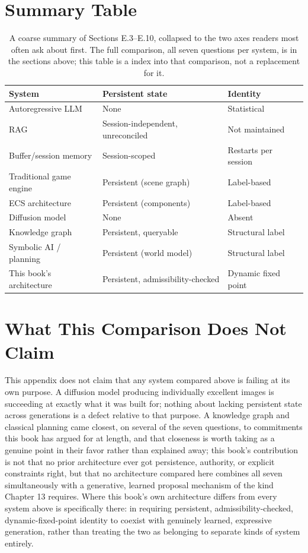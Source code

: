 \section{Summary Table}

\begin{table}[p]
\small
\begin{tabular}{@{}p{3.1cm}p{2.0cm}p{2.1cm}@{}}
\toprule
System & Persistent state & Identity \\
\midrule
Autoregressive LLM & None & Statistical \\
RAG & Session-independent, unreconciled & Not maintained \\
Buffer/session memory & Session-scoped & Restarts per session \\
Traditional game engine & Persistent (scene graph) & Label-based \\
ECS architecture & Persistent (components) & Label-based \\
Diffusion model & None & Absent \\
Knowledge graph & Persistent, queryable & Structural label \\
Symbolic AI / planning & Persistent (world model) & Structural label \\
This book's architecture & Persistent, admissibility-checked & Dynamic fixed point \\
\bottomrule
\end{tabular}
\caption{A coarse summary of Sections E.3--E.10, collapsed to the two axes readers most often ask about first. The full comparison, all seven questions per system, is in the sections above; this table is a index into that comparison, not a replacement for it.}
\end{table}

\section{What This Comparison Does Not Claim}

This appendix does not claim that any system compared above is failing at its own purpose. A diffusion model producing individually excellent images is succeeding at exactly what it was built for; nothing about lacking persistent state across generations is a defect relative to that purpose. A knowledge graph and classical planning came closest, on several of the seven questions, to commitments this book has argued for at length, and that closeness is worth taking as a genuine point in their favor rather than explained away; this book's contribution is not that no prior architecture ever got persistence, authority, or explicit constraints right, but that no architecture compared here combines all seven simultaneously with a generative, learned proposal mechanism of the kind Chapter 13 requires. Where this book's own architecture differs from every system above is specifically there: in requiring persistent, admissibility-checked, dynamic-fixed-point identity to coexist with genuinely learned, expressive generation, rather than treating the two as belonging to separate kinds of system entirely.
